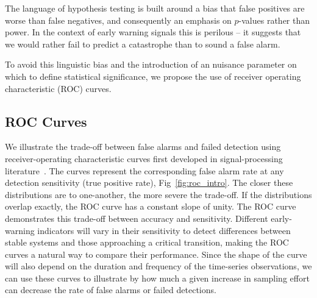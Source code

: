 \documentclass[authoryear,review,11pt]{elsarticle}
\begin{document}
The language of hypothesis testing is built around a bias that false positives are worse than false negatives, 
and consequently an emphasis on $p$-values rather than power.  
In the context of early warning signals this is perilous -- 
it suggests that we would rather fail to predict a catastrophe than to sound a false alarm.

To avoid this linguistic bias and the introduction of an nuisance parameter on which to define statistical significance, 
we propose the use of receiver operating characteristic (ROC) curves.

\subsection*{ROC Curves}
We illustrate the trade-off between false alarms and failed detection using 
receiver-operating characteristic curves first developed in signal-processing literature~\citep{Green1989, Keller2009}⁠. 
The curves represent the corresponding false alarm rate at any detection sensitivity (true positive rate), Fig~\ref{fig:roc_intro}.
The closer these distributions are to one-another, the more severe the trade-off.  
If the distributions overlap exactly, the ROC curve has a constant slope of unity.  
The ROC curve demonstrates this trade-off between accuracy and sensitivity.  
Different early-warning indicators will vary in their sensitivity to detect differences
between stable systems and those approaching a critical transition,
making the ROC curves a natural way to compare their performance.  
Since the shape of the curve will also depend on the duration and frequency of the time-series observations,
we can use these curves to illustrate by how much a given increase in sampling effort can decrease the rate of false alarms or failed detections.  
\end{document}
